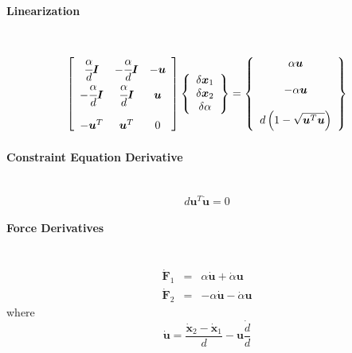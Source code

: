 \documentclass[10pt,dvips,fleqn]{report}
\newcommand{\T}[1]{\boldsymbol{#1}}
\begin{document}
\paragraph{Linearization} \
\begin{equation}
	\sqbr{\matr{ccc}{
		\cfrac{\alpha}{d}\T{I} & -\cfrac{\alpha}{d}\T{I} & -\T{u} \\
		-\cfrac{\alpha}{d}\T{I} & \cfrac{\alpha}{d}\T{I} & \T{u} \\
		\\
		-\T{u}^T & \T{u}^T & 0
	}}\cubr{\cvvect{
		\delta\T{x}_1 \\
		\delta\T{x}_2 \\
		\delta\alpha
	}} = \cubr{\cvvect{
		\alpha \T{u} \\
		\\
		- \alpha \T{u} \\
		\\
		d\plbr{1 - \sqrt{\T{u}^T \T{u}}}
	}}
\end{equation}

\paragraph{Constraint Equation Derivative} \
\begin{equation}
	d \T{u}^T \dot{\T{u}} = 0
\end{equation}

\paragraph{Force Derivatives} \
\begin{eqnarray}
	\dot{\T{F}}_1 & = & \alpha \dot{\T{u}} + \dot{\alpha} \T{u} \\
	\dot{\T{F}}_2 & = & -\alpha \dot{\T{u}} - \dot{\alpha} \T{u}
\end{eqnarray}
where
\begin{equation}
	\dot{\T{u}} = \frac{\dot{\T{x}}_2 - \dot{\T{x}}_1}{d} - \T{u} \frac{\dot{d}}{d}
\end{equation}
\end{document}
